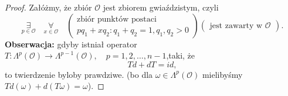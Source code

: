 \documentclass[../main.tex]{subfiles}
\begin{document}
\begin{proof}
    Załóżmy, że zbiór $\mathcal{O}$ jest zbiorem gwiaździstym, czyli
    \[
        \underset{p\in\mathcal{O}}{\exists}\quad \underset{x\in \mathcal{O}}{\forall}\quad \begin{pmatrix}\text{zbiór punktów postaci}\\ pq_1 + xq_2: q_1+q_2 = 1, q_1,q_2 > 0\end{pmatrix}\begin{pmatrix} \text{jest zawarty w }\mathcal{O} \end{pmatrix}
    .\]
\textbf{Obserwacja:} gdyby istniał operator $T: \Lambda^p(\mathcal{O}) \to \Lambda^{p-1}(\mathcal{O}),\quad p = 1,2,\ldots,n-1$,taki, że
\[
Td + dT = id
,\]
to twierdzenie byloby prawdziwe. (bo dla $\omega\in \Lambda^p(\mathcal{O})$ mielibyśmy $Td(\omega) + d(T\omega) = \omega$).


\end{proof}
\end{document}
